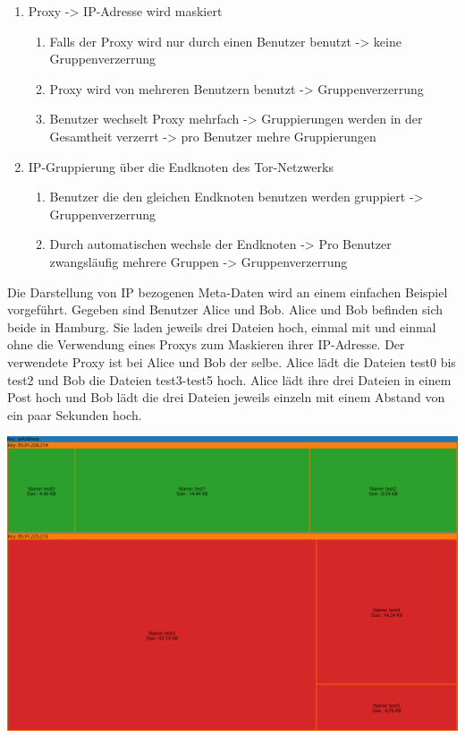 \documentclass[
    fontsize=12pt,
    headings=small,
    parskip=half,           %
    bibliography=totoc,
    numbers=noenddot,       %
    open=any,               %
    ]{scrreprt}
\begin{document}
\begin{enumerate}
\item Proxy -> IP-Adresse wird maskiert
\begin{enumerate}
\item Falls der Proxy wird nur durch einen Benutzer benutzt -> keine Gruppenverzerrung 
\item Proxy wird von mehreren Benutzern benutzt -> Gruppenverzerrung 
\item Benutzer wechselt Proxy mehrfach -> Gruppierungen werden in der Gesamtheit verzerrt -> pro Benutzer mehre Gruppierungen 
\end{enumerate}
\item IP-Gruppierung über die Endknoten des Tor-Netzwerks 
\begin{enumerate}
\item Benutzer die den gleichen Endknoten benutzen werden gruppiert -> Gruppenverzerrung 
\item Durch automatischen wechsle der Endknoten -> Pro Benutzer zwangsläufig mehrere Gruppen -> Gruppenverzerrung 
\end{enumerate}
\end{enumerate}


Die Darstellung von IP bezogenen Meta-Daten wird an einem einfachen Beispiel vorgeführt.
Gegeben sind Benutzer Alice und Bob.
Alice und Bob befinden sich beide in Hamburg.
Sie laden jeweils drei Dateien hoch, einmal mit und einmal ohne die Verwendung eines Proxys zum Maskieren ihrer IP-Adresse.
Der verwendete Proxy ist bei Alice und Bob der selbe.
Alice lädt die Dateien test0 bis test2 und Bob die Dateien test3-test5 hoch.
Alice lädt ihre drei Dateien in einem Post hoch und Bob lädt die drei Dateien jeweils einzeln mit einem Abstand von ein paar Sekunden hoch.

\begin{center}
\includegraphics[width=\textwidth]{../pic/IP-Proxy-SetA-tree.png}
\end{center}
\end{document}
